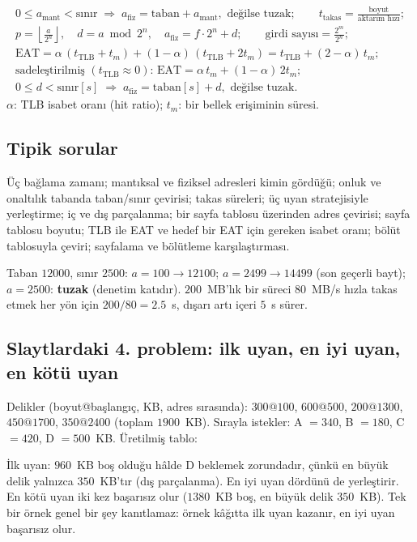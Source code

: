 \documentclass[11pt,a4paper]{article}
\begin{document}
\begin{keyidea}
\begin{gather*}
0 \le a_{\text{mant}} < \text{sınır} \;\Rightarrow\; a_{\text{fiz}} = \text{taban} + a_{\text{mant}}, \text{ değilse tuzak}; \qquad
t_{\text{takas}} = \frac{\text{boyut}}{\text{aktarım hızı}};\\
p = \left\lfloor \frac{a}{2^{n}} \right\rfloor, \quad d = a \bmod 2^{n}, \quad a_{\text{fiz}} = f\cdot 2^{n} + d; \qquad
\text{girdi sayısı} = \frac{2^{m}}{2^{n}};\\
\text{EAT} = \alpha\,(t_{\text{TLB}} + t_{m}) + (1-\alpha)\,(t_{\text{TLB}} + 2t_{m}) = t_{\text{TLB}} + (2-\alpha)\,t_{m};\\
\text{sadeleştirilmiş } (t_{\text{TLB}}\approx 0)\text{: } \text{EAT} = \alpha\,t_m + (1-\alpha)\,2t_m;\\
0 \le d < \text{sınır}[s] \;\Rightarrow\; a_{\text{fiz}} = \text{taban}[s] + d, \text{ değilse tuzak}.
\end{gather*}
$\alpha$: TLB isabet oranı (hit ratio); $t_m$: bir bellek erişiminin süresi.
\end{keyidea}

\subsection*{Tipik sorular}
Üç bağlama zamanı; mantıksal ve fiziksel adresleri kimin gördüğü; onluk ve onaltılık tabanda taban/sınır çevirisi; takas süreleri; üç uyan stratejisiyle yerleştirme; iç ve dış parçalanma; bir sayfa tablosu üzerinden adres çevirisi; sayfa tablosu boyutu; TLB ile EAT ve hedef bir EAT için gereken isabet oranı; bölüt tablosuyla çeviri; sayfalama ve bölütleme karşılaştırması.

\begin{example}
Taban $12000$, sınır $2500$: $a = 100 \to 12100$; $a = 2499 \to 14499$ (son geçerli bayt); $a = 2500$: \textbf{tuzak} (denetim katıdır). $200$~MB'lık bir süreci $80$~MB/s hızla takas etmek her yön için $200/80 = 2.5$~s, dışarı artı içeri $5$~s sürer.
\end{example}

\subsection{Slaytlardaki 4. problem: ilk uyan, en iyi uyan, en kötü uyan}
Delikler (boyut@başlangıç, KB, adres sırasında): $300@100$, $600@500$, $200@1300$, $450@1700$, $350@2400$ (toplam $1900$~KB). Sırayla istekler: A $= 340$, B $= 180$, C $= 420$, D $= 500$~KB. Üretilmiş tablo:
\begin{center}\small{}\end{center}
İlk uyan: $960$~KB boş olduğu hâlde D beklemek zorundadır, çünkü en büyük delik yalnızca $350$~KB'tır (dış parçalanma). En iyi uyan dördünü de yerleştirir. En kötü uyan iki kez başarısız olur ($1380$~KB boş, en büyük delik $350$~KB). Tek bir örnek genel bir şey kanıtlamaz: örnek kâğıtta ilk uyan kazanır, en iyi uyan başarısız olur.
\end{document}
